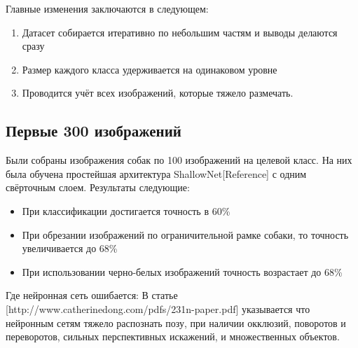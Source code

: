 Главные изменения заключаются в следующем:
\begin{enumerate}
    \item Датасет собирается итеративно по небольшим частям и выводы делаются сразу
    \item Размер каждого класса удерживается на одинаковом уровне
    \item Проводится учёт всех изображений, которые тяжело размечать.
\end{enumerate}{}

\subsection{Первые 300 изображений} \label{subsect3_3_2}
Были собраны изображения собак по 100 изображений на целевой класс. На них была обучена простейшая архитектура ShallowNet[Reference] с одним свёрточным слоем.
Результаты следующие:
\begin{itemize}
    \item При классификации достигается точность в 60\%
    \item При обрезании изображений по ограничительной рамке собаки, то точность увеличивается до 68\%
    \item При использовании черно-белых изображений точность возрастает до 68\%
\end{itemize}

Где нейронная сеть ошибается:
В статье [http://www.catherinedong.com/pdfs/231n-paper.pdf]  указывается что нейронным сетям тяжело распознать позу, при наличии окклюзий, поворотов и переворотов, сильных перспективных искажений, и множественных объектов.

